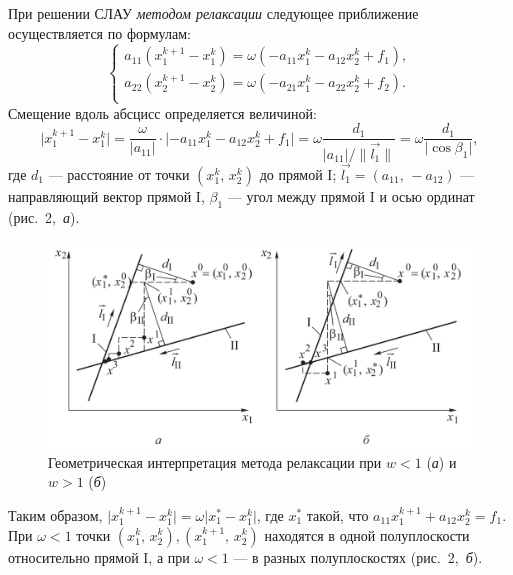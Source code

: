 \documentclass[12pt, a4paper]{article}
\newcommand{\norm}[1]{\lVert #1 \rVert}
\newcommand{\abs}[1]{\lvert #1 \rvert}
\begin{document}
\begin{enumerate}
При решении СЛАУ \emph{методом релаксации} следующее приближение осуществляется по формулам:
\begin{equation*}
        	\begin{cases}
        		a_{11} \left( x^{k+1}_1 - x^k_1 \right) = \omega \left( -a_{11} x_1^k - a_{12} x_2^k + f_1 \right),\\
        		a_{22} \left( x^{k+1}_2 - x^k_2 \right) = \omega \left( -a_{21} x_1^k - a_{22} x_2^k + f_2 \right).\\
        	\end{cases}
\end{equation*}
Смещение вдоль абсцисс определяется величиной:
\begin{equation*}
\abs{x^{k+1}_1 - x^k_1} = \frac{\omega}{\abs{a_{11}}} \cdot \abs{-a_{11} x_1^k - a_{12} x_2^k + f_1} = \omega \dfrac{d_1}{\abs{a_{11}} / \norm{\overrightarrow{l_1}}} = \omega \dfrac{d_1}{\abs{\cos \beta_1}},
\end{equation*}
где $d_1$ --- расстояние от точки $\left( x_1^k, \, x_2^k \right) $ до прямой I; $\overrightarrow{l_1} = (a_{11}, \, -a_{12} )$ --- направляющий вектор прямой I, $\beta_1$ --- угол между прямой I и осью ординат \mbox{(рис. 2, \emph{а})}.
\begin{figure}[H]
		\centering
		\includegraphics[width=0.8\linewidth]{geom_relax.png}
		\caption{Геометрическая интерпретация метода релаксации при $w < 1$ (\emph{а}) и $w > 1$ (\emph{б})}
		\label{relax}
\end{figure}
Таким образом, $\abs{x^{k+1}_1 - x^k_1} = \omega \abs{x^{*}_1 - x^k_1}$, где $x^*_1$ такой, что $a_{11} x^{k+1}_1 + a_{12} x^k_2 = f_1$. При $\omega < 1$ точки $\left( x_1^k, \, x_2^k \right), \left( x_1^{k+1}, \, x_2^k \right)$ находятся в одной полуплоскости относительно прямой I, а при $\omega < 1$ --- в разных полуплоскостях \mbox{(рис. 2, \emph{б}).} 


\end{enumerate}
\end{document}
